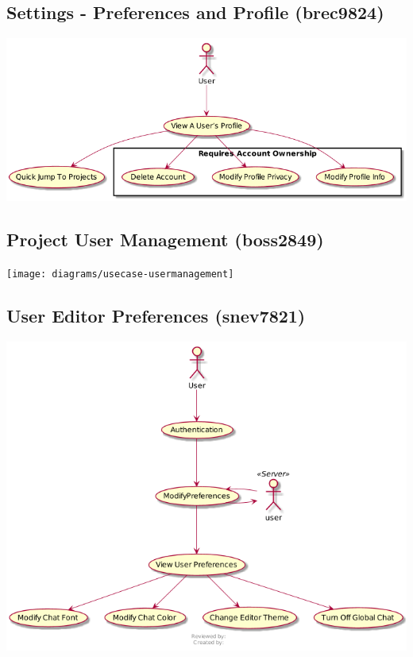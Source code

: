 \documentclass[11pt]{report}
\begin{document}
    \subsection{Settings - Preferences and Profile (brec9824)}
        \includegraphics[width=\textwidth]{diagrams/usecase-settingsmanager}
    \subsection{Project User Management (boss2849)} 
        \texttt{[image: diagrams/usecase-usermanagement]}
    \subsection{User Editor Preferences (snev7821)}
        \includegraphics[width=\textwidth]{diagrams/usecase-preferences}
\end{document}
